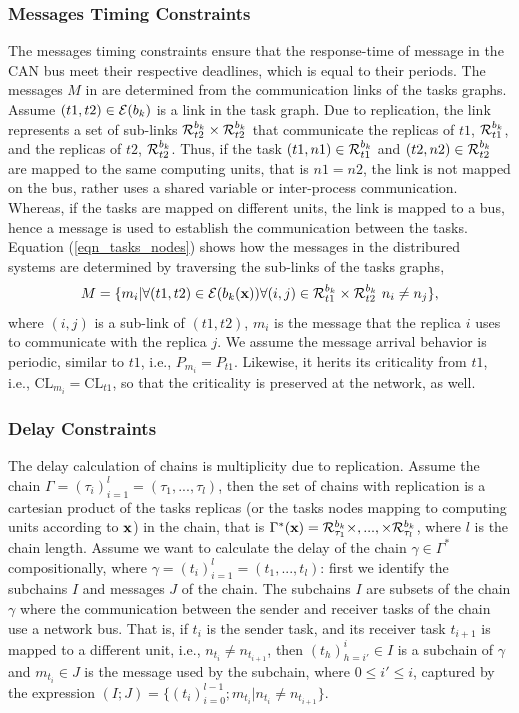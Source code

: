 \subsubsection{Messages Timing Constraints}
The messages timing constraints ensure that the response-time of message in the CAN bus meet their respective deadlines, which is equal to their periods. The messages $M$ in \ttx are determined from the communication links of the tasks graphs. Assume $(t1,t2)\in\mathcal{E}(b_{k})$ is a link in the task graph. Due to replication, the link represents a set of sub-links $\sss{\mathcal{R}}[k][t2][b]\times\sss{\mathcal{R}}[k][t2][b]$ that communicate the replicas of $t1$, $\sss{\mathcal{R}}[k][t1][b]$, and the replicas of $t2$, $\sss{\mathcal{R}}[k][t2][b]$. Thus, if the task $(t1,n1)\in\sss{\mathcal{R}}[k][t1][b]$ and $(t2,n2)\in\sss{\mathcal{R}}[k][t2][b]$ are mapped to the same  computing units, that is $n1=n2$, the link is not mapped on the bus, rather uses a shared variable or inter-process communication. Whereas, if the tasks are mapped on different units, the link is mapped to a bus, hence a message is used to establish the communication between the tasks. Equation (\ref{eqn_tasks_nodes}) shows how the messages in the distribured systems are determined by traversing the sub-links of the tasks graphs, 
\begin{equation}
\label{eqn_tasks_nodes}
M=\{m_i | \forall (t1,t2)\in \mathcal{E}(\atx)\forall (i,j)\in\sss{\mathcal{R}}[k][t1][b]\times\sss{\mathcal{R}}[k][t2][b]\ n_i\neq n_j\},
\end{equation}
where $(i,j)$ is a sub-link of $(t1,t2)$, $m_{i}$ is the message that the replica $i$ uses to communicate with the replica $j$.  We assume the message arrival behavior is periodic, similar to $t1$, i.e., $P_{m_i }= P_{t1}$. Likewise, it herits its criticality from $t1$, i.e., $\mathrm{CL}_{m_i}=\mathrm{CL}_{t1}$, so that the criticality is preserved at the network, as well.

\subsubsection{Delay  Constraints}
The delay calculation of chains is multiplicity due to replication. Assume the chain $\Gamma=(\tau_i)_{i=1}^l=(\tau_1,...,\tau_l)$, then the set of chains with replication is a cartesian product of the tasks replicas (or the tasks nodes mapping to computing units according to $\textbf{x}$) in the chain, that is $\Gamma^*(\x)= \sss{\mathcal{R}}[k][\tau_1][b]\times,...,\times\sss{\mathcal{R}}[k][\tau_l][b]$, where $l$ is the chain length. Assume we want to calculate the delay of the chain $\gamma\in \Gamma^*$ compositionally, where $\gamma=(t_i)_{i=1}^l=(t_1,...,t_l)$: first we identify the subchains $I$ and messages $J$ of the chain. The subchains $I$ are subsets of the chain $\gamma$ where the communication between the sender and receiver tasks of the chain use a network bus. That is, if $t_i$ is the sender task, and its receiver task $t_{i+1}$ is mapped to a different unit, i.e., $n_{t_i}\neq n_{t_{i+1}}$, then $(t_h)_{h=i'}^i\in I$ is a subchain of $\gamma$ and $m_{t_i}\in J$ is the message used by the subchain, where $0\leq i'\leq i$, captured by the expression
$
	(I;J)=\{(t_i)_{i=0}^{l-1};m_{t_i} | n_{t_i}\neq n_{t_{i+1}}\}
$.
	
